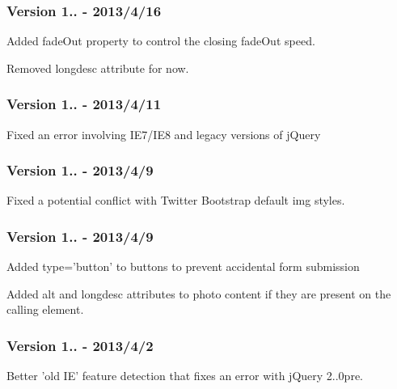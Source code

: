 \subsubsection*{Version 1.. -\/ 2013/4/16}


\begin{DoxyItemize}
\item Added fade\-Out property to control the closing fade\-Out speed.
\item Removed longdesc attribute for now.
\end{DoxyItemize}

\subsubsection*{Version 1.. -\/ 2013/4/11}


\begin{DoxyItemize}
\item Fixed an error involving I\-E7/\-I\-E8 and legacy versions of j\-Query
\end{DoxyItemize}

\subsubsection*{Version 1.. -\/ 2013/4/9}


\begin{DoxyItemize}
\item Fixed a potential conflict with Twitter Bootstrap default img styles.
\end{DoxyItemize}

\subsubsection*{Version 1.. -\/ 2013/4/9}


\begin{DoxyItemize}
\item Added {\ttfamily type='button'} to buttons to prevent accidental form submission
\item Added alt and longdesc attributes to photo content if they are present on the calling element.
\end{DoxyItemize}

\subsubsection*{Version 1.. -\/ 2013/4/2}


\begin{DoxyItemize}
\item Better 'old I\-E' feature detection that fixes an error with j\-Query 2..\-0pre.
\end{DoxyItemize}


